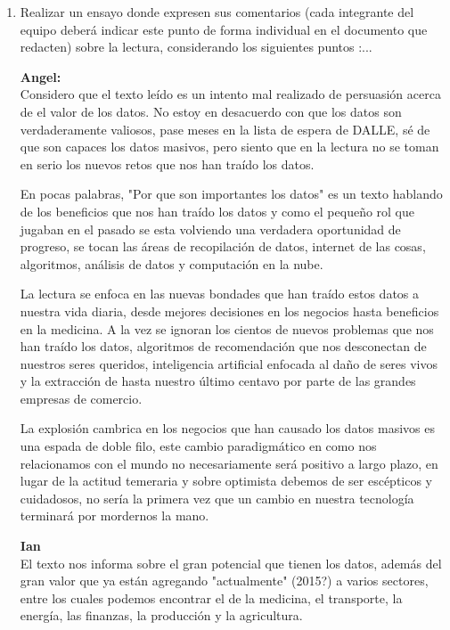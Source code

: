 \documentclass[12pt,a4paper]{article}
\begin{document}
\begin{enumerate}
\begin{enumerate}
			\item Realizar un ensayo donde expresen sus comentarios (cada integrante del equipo deberá indicar este
				punto de forma individual en el documento que redacten) sobre la lectura, considerando los siguientes puntos :...

				\textbf{Angel:}\\
				Considero que el texto leído es un intento mal realizado de
				persuasión acerca de el valor de los datos.
				No estoy en desacuerdo con que los datos son verdaderamente
				valiosos, pase meses en la lista de espera de DALLE, sé
				de que son capaces los datos masivos, pero siento que
				en la lectura no se toman en serio los nuevos retos
				que nos han traído los datos.

				En pocas palabras, "Por que son importantes los datos"
				es un texto hablando de los beneficios que nos han traído los
				datos y como el pequeño rol que jugaban en el pasado
				se esta volviendo una verdadera oportunidad de progreso,
				se tocan las áreas de recopilación de datos, internet de las cosas,
				algoritmos, análisis de datos y computación en la nube. 

				La lectura se enfoca en las nuevas bondades que han traído
				estos datos a nuestra vida diaria, desde mejores decisiones en los
				negocios hasta beneficios en la medicina.
				A la vez se ignoran los cientos de nuevos problemas que nos han traído
				los datos, algoritmos de recomendación que nos desconectan de nuestros
				seres queridos, inteligencia artificial enfocada al daño de seres
				vivos y la extracción de hasta nuestro último centavo por parte
				de las grandes empresas de comercio.

				La explosión cambrica en los negocios que han causado
				los datos masivos es una espada de doble filo, este cambio
				paradigmático en como nos relacionamos con el mundo no necesariamente
				será positivo a largo plazo, en lugar de la actitud temeraria y
				sobre optimista debemos de ser escépticos y cuidadosos, no
				sería la primera vez que un cambio en nuestra tecnología
				terminará por mordernos la mano.

				\textbf{Ian}\\
				El texto nos informa sobre el gran potencial que tienen los datos, 
				además del gran valor que ya están agregando "actualmente" (2015?) 
				a varios sectores, entre los cuales podemos encontrar el de la medicina, 
				el transporte, la energía, las finanzas, la producción y la agricultura.


\end{enumerate}
\end{enumerate}
\end{document}
